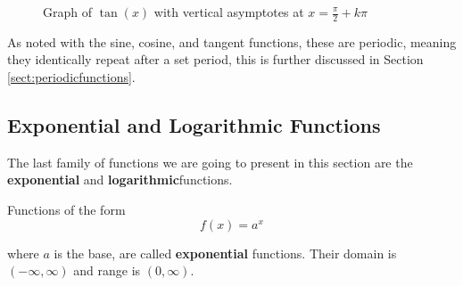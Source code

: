         \begin{figure}
            \centering
            \caption{Graph of $\tan(x)$ with vertical asymptotes at $x = \frac{\pi}{2} + k\pi$}
            \label{fig:tangentgraph}
        \end{figure}

        As noted with the sine, cosine, and tangent functions, these are periodic, meaning they identically repeat after a set period, this is further discussed in Section \ref{sect:periodicfunctions}.

        \subsection{Exponential and Logarithmic Functions}
        \label{sect:explog}
        The last family of functions we are going to present in this section are the \textbf{exponential} and \textbf{logarithmic}functions.

        \begin{definition}
            Functions of the form
            \begin{equation}
                f(x) = a^x
            \end{equation}

            where $a$ is the base, are called \textbf{exponential} functions. Their domain is $(-\infty,\infty)$ and range is $(0,\infty)$.
        \end{definition}

